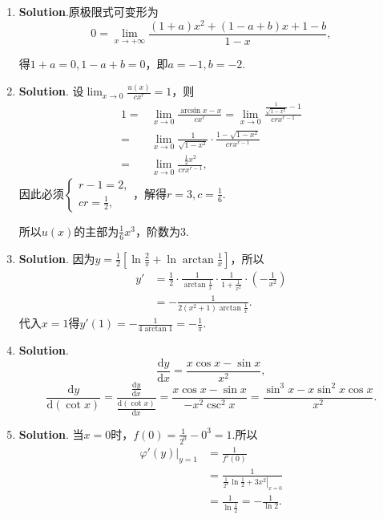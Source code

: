 \documentclass[../main.tex]{subfiles}
\begin{document}
\begin{enumerate}
    \item \textbf{Solution}.原极限式可变形为
          \[
              0=\lim_{x\to+\infty}\frac{(1+a)x^{2}+(1-a+b)x+1-b}{1-x},
          \]

          得$1+a=0,1-a+b=0$，即$a=-1,b=-2$.

    \item \textbf{Solution}. 设$\lim_{x\to0}\frac{u(x)}{cx^{r}}=1$，则
          \[
              \begin{aligned}
                  1= {} & \lim_{x\to0}\frac{\arcsin x- x}{cx^{r}}=\lim_{x\to0}\frac{\frac{1}{\sqrt{1-x^{2}}}-1}{crx^{r-1}} \\
                  = {}  & \lim_{x\to0}\frac{1}{\sqrt{1-x^2}}\cdot\frac{1-\sqrt{1-x^2}}{crx^{r-1}}                          \\
                  = {}  & \lim_{x\to0}\frac{\frac{1}{2}x^2}{crx^{r-1}},
              \end{aligned}
          \]
          因此必须$\begin{cases}
                  r-1=2, \\
                  cr=\frac{1}{2},
              \end{cases}$，解得$r=3,c=\frac{1}{6}$.

          所以$u(x)$的主部为$\frac{1}{6}x^{3}$，阶数为3.

    \item \textbf{Solution}. 因为$y=\frac{1}{2}\left[\ln\frac{2}{\pi}+\ln\arctan\frac{1}{x}
                  \right]$，所以
          \[
              \begin{aligned}
                  y' & =\frac{1}{2}\cdot\frac{1}{\arctan\frac{1}{x}}\cdot\frac{1}{1+\frac{1}{x^{2}}}\cdot\left(-\frac{1}{x^{2}}\right) \\
                     & = -\frac{1}{2(x^{2}+1)\arctan\frac{1}{x}}.
              \end{aligned}
          \]
          代入$x=1$得$y'(1)=-\frac{1}{4\arctan 1}=-\frac{1}{\pi}$.

    \item \textbf{Solution}.
          \[
              \frac{\mathrm{d}y}{\mathrm{d}x}=\frac{x\cos x-\sin x}{x^{2}},
          \]
          \[
              \frac{\mathrm{d}y}{\mathrm{d}(\cot x)}=\frac{\frac{\mathrm{d}y}{\mathrm{d}x}}{\frac{\mathrm{d}(\cot
                      x)}{\mathrm{d}x}}=\frac{x\cos x-\sin x}{-x^{2}\csc^{2} x}=\frac{\sin^{3} x-x\sin^{2}
                  x\cos x}{x^{2}}.
          \]

    \item \textbf{Solution}. 当$x=0$时，$f(0)=\frac{1}{2^{0}}-0^{3}=1$.所以
          \[
              \begin{aligned}
                  \left.\varphi'(y)\right|_{y=1} & =\frac{1}{f'(0)}                                                \\
                                                 & = \frac{1}{\left.\frac{1}{2^x}\ln\frac{1}{2}+3x^2\right|_{x=0}} \\
                                                 & = \frac{1}{\ln\frac{1}{2}}=-\frac{1}{\ln 2}.
              \end{aligned}
          \]


\end{enumerate}
\end{document}
